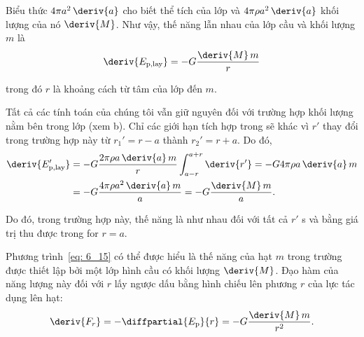 \noindent
Biểu thức $4\pi a^2\,\deriv{a}$ cho biết thể tích của lớp và $4\pi\rho a^2\,\deriv{a}$ khối lượng của nó $\deriv{M}$. Như vậy, thế năng lẫn nhau của lớp cầu và khối lượng $m$ là
\begin{equation}\label{eq:6_15}
	\deriv{E_{\text{p,lay}}} = -G\frac{\deriv{M}\,m}{r}
\end{equation}

\noindent
trong đó $r$ là khoảng cách từ tâm của lớp đến $m$.

Tất cả các tính toán của chúng tôi vẫn giữ nguyên đối với trường hợp khối lượng nằm bên trong lớp (xem b). Chỉ các giới hạn tích hợp trong  sẽ khác vì $r'$ thay đổi trong trường hợp này từ $r_1'=r-a$ thành $r_2'=r+a$. Do đó,
\begin{align}
	\deriv{E_{\text{p,lay}}'} &= -G\frac{2\pi\rho a\,\deriv{a}\,m}{r} \int_{a-r}^{a+r} \deriv{r'} = -G4\pi\rho a\,\deriv{a}\,m\nonumber\\
	& = -G \frac{4\pi\rho a^2\,\deriv{a}\,m}{a} = -G\frac{\deriv{M}\,m}{a}.\label{eq:6_16}
\end{align}

\noindent
Do đó, trong trường hợp này, thế năng là như nhau đối với tất cả $r'$ s và bằng giá trị thu được trong  for $r=a$.

Phương trình~\eqref{eq: 6_15} có thể được hiểu là thế năng của hạt $m$ trong trường được thiết lập bởi một lớp hình cầu có khối lượng $\deriv{M}$. Đạo hàm của năng lượng này đối với $r$ lấy ngược dấu bằng hình chiếu lên phương $r$ của lực tác dụng lên hạt:
\begin{equation}\label{eq:6_17}
	\deriv{F_r} = -\diffpartial{E_{\text{p}}}{r} = -G\frac{\deriv{M}\,m}{r^2}.
\end{equation}

